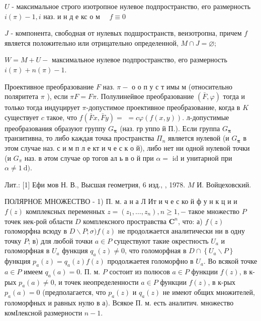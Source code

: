 \documentclass[10pt]{article}
\begin{document}
$U$ - максимальное строго изотропное нулевое подпространство, его размерность $i(\pi)-1, i$ наз. и н д е кс о м $\quad f \equiv 0$



$J$ - компонента, свободная от нулевых подшространств, веизотропна, причем $f$ является положительно или отрицательно определенной, $M \cap J=\varnothing$;



$W=M+U-$ максимальное нулевое подпространство, его размерность $i(\pi)+n(\pi)-1$.



Проективное преобразование $F$ наз. $\pi-$ о о п у с т имы м (относительно поляритета $\pi$ ), если $\pi F=F \pi$. Полулинейвое преобразование $(\bar{F}, \varphi)$ тогда и только тогда индуцирует $\pi$-допустимое проективное преобразование, когда в $K$ существует $c$ такое, что $f(\bar{F} x, \bar{F} y)=$ $=c \varphi(f(x, y))$. л-допустимые преобразования образуют группу $G_{\boldsymbol{\pi}}$ (наз. гр уппо й П.). Если группа $G_{\boldsymbol{\pi}}$ транзитивна, то либо каждая точка пространства $\Pi_{n}$ является нулевой (и $G_{\boldsymbol{\pi}}$ в этом случае наз. с и м п л е кт и ч е с к о й), либо нет ни одной нулевой точки (и $G_{\pi}$ наз. в әтом случае ор тогов ал ь в о й при $\alpha=$ id и унитарной при $\alpha \neq 1 \mathrm{~d})$.



Лит.: [1] Ефи мов Н. В., Высшая геометрия, 6 изд., , 1978. $M$ И. Войцеховский.



ПОЛЯРНОЕ МНОЖЕСТВО - 1) П. м. а н а Л Ит и ч е с ко й ф у н к ц и и $f(z)$ комплексных переменных $z=\left(z_{1}, \ldots, z_{n}\right), n \geqslant 1,-$ такое множество $P$ точек нек-рой области $D$ комплексного простравства $\mathbf{C}^{n}$, что: а) $f(z)$ голоморфна всюду в $D \backslash P ; \sigma) f(z)$ не продолжается аналитически ни в одну точку $P$; в) для любой точки $a \in P$ существуют такие окрестность $U_{a}$ и голоморфная в $U_{a}$ функция $q_{a}(z) \neq 0$, что голоморфная в $D \cap\left\{U_{a} \backslash P\right\}$ функция $p_{a}(z)=q_{a}(z) f(z)$ продолжаетея голоморфно в $U_{a}$. Во всякой точке $a \in P$ имеем $q_{a}(a)=0$. П. м. $P$ состоит из полюсов $a \in P$ функции $f(z)$, в к-рых $p_{a}(a) \neq 0$, и точек неопределенности $a \in P$ функции $f(z)$, в к-рых $p_{a}(a)=0$ (предполагается, что $p_{a}(z)$ и $q_{a}(z)$ не имеют общих множителей, голоморфных и равных нулю в а). Всякое П. м. есть аналитич. множество комІлексной размерности $n-1$.
\end{document}
